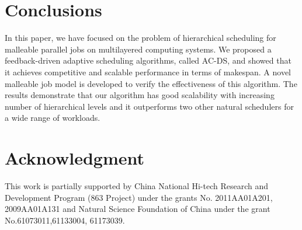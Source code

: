 \documentclass[10pt, a4paper]{article}
\begin{document}
\section{Conclusions}

In this paper, we have focused on the problem of hierarchical scheduling for malleable parallel
jobs on multilayered computing systems. We proposed a feedback-driven adaptive scheduling
algorithms, called AC-DS, and showed that it achieves competitive and scalable performance in terms
of makespan. A novel malleable job model is developed to verify the effectiveness of this
algorithm. The results demonstrate that our algorithm has good scalability with increasing number
of hierarchical levels and it outperforms two other natural schedulers for a wide range of
workloads. 

\section*{Acknowledgment}

This work is partially supported by China National Hi-tech Research and Development Program (863
Project) under the grants No. 2011AA01A201, 2009AA01A131 and Natural Science Foundation of China
under the grant No.61073011,61133004, 61173039.
\end{document}
